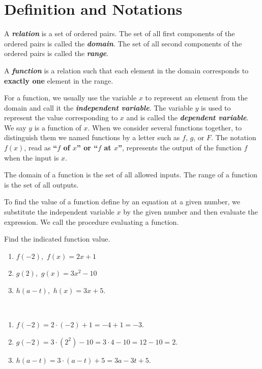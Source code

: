 \documentclass[
  en,11pt]{elegantbook}
\let\BeginKnitrBlock\begin \let\EndKnitrBlock\end
\begin{document}
\hypertarget{definition-and-notations}{%
\section{Definition and Notations}\label{definition-and-notations}}

A \textbf{\emph{relation}} is a set of ordered pairs. The set of all first components of the ordered pairs is called the \textbf{\emph{domain}}. The set of all second components of the ordered pairs is called the \textbf{\emph{range}}.

A \textbf{\emph{function}} is a relation such that each element in the domain corresponds to \textbf{exactly one} element in the range.

For a function, we usually use the variable \(x\) to represent an element from the domain and call it the \textbf{\emph{independent variable}}. The variable \(y\) is used to represent the value corresponding to \(x\) and is called the \textbf{\emph{dependent variable}}. We say \(y\) is a function of \(x\). When we consider several functions together, to distinguish them we named functions by a letter such as \(f\), \(g\), or \(F\). The notation \(f(x)\), read as \textbf{``\(f\) of \(x\)'' or ``\(f\) at \(x\)''}, represents the output of the function \(f\) when the input is \(x\).

The domain of a function is the set of all allowed inputs. The range of a function is the set of all outputs.

To find the value of a function define by an equation at a given number, we substitute the independent variable \(x\) by the given number and then evaluate the expression. We call the procedure evaluating a function.

\BeginKnitrBlock{example}
\protect\hypertarget{exm:unnamed-chunk-219}{}{\label{exm:unnamed-chunk-219} }
Find the indicated function value.

\begin{enumerate}
\def\labelenumi{\arabic{enumi}.}

\item
  \(f(-2)\),~\(f(x)=2x+1\)
\item
  \(g(2)\),~\(g(x)=3x^2-10\)
\item
  \(h(a-t)\),~\(h(x)=3x+5\).
\end{enumerate}
\EndKnitrBlock{example}

\BeginKnitrBlock{solution}
{}\\

\begin{enumerate}
\def\labelenumi{\arabic{enumi}.}

\item
  \(f(-2)=2\cdot(-2)+1=-4+1=-3\).
\item
  \(g(-2)=3\cdot(2^2)-10=3\cdot 4-10=12-10=2\).
\item
  \(h(a-t)=3\cdot(a-t)+5=3a-3t+5\).
\end{enumerate}
\EndKnitrBlock{solution}
\end{document}

